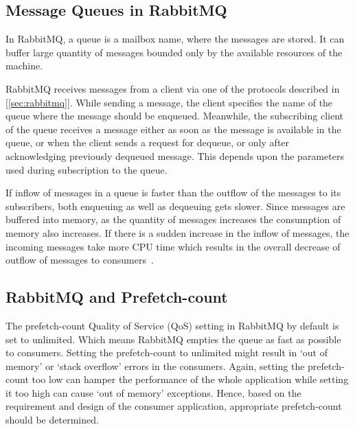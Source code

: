   \subsection{Message Queues in RabbitMQ}
  In RabbitMQ, a queue is a mailbox name, where the messages are stored. It can buffer large quantity of messages bounded only by the available resources of the machine.

  RabbitMQ receives messages from a client via one of the protocols described in [\autoref{sec:rabbitmq}]. While sending a message, the client specifies the name of the queue where the message should be enqueued. Meanwhile, the subscribing client of the queue receives a message either as soon as the message is available in the queue, or when the client sends a request for dequeue, or only after acknowledging previously dequeued message. This depends upon the parameters used during subscription to the queue.

  If inflow of messages in a queue is faster than the outflow of the messages to its subscribers, both enqueuing as well as dequeuing gets slower. Since messages are buffered into memory, as the quantity of messages increases the consumption of memory also increases. If there is a sudden increase in the inflow of messages, the incoming messages take more CPU time which results in the overall decrease of outflow of messages to consumers~\cite{sizingYourRabbits}.

  \subsection{RabbitMQ and Prefetch-count}
  \label{subsec:rabbitmqPrefetch}
  The prefetch-count Quality of Service (QoS) setting in RabbitMQ by default is set to unlimited. Which means RabbitMQ empties the queue as fast as possible to consumers. Setting the prefetch-count to unlimited might result in ‘out of memory’ or ‘stack overflow’ errors in the consumers. Again, setting the prefetch-count too low can hamper the performance of the whole application while setting it too high can cause  ‘out of memory’ exceptions. Hence, based on the requirement and design of the consumer application, appropriate prefetch-count should be determined.

